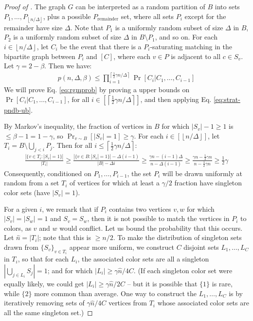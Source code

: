 \documentclass[10pt]{article}
\theoremstyle{definition}\newtheorem{definition}[lemma]{Definition}
\theoremstyle{remark}  \newtheorem*{remark}{Remark}
\newcommand{\hatn}{\hat{n}}
\newcommand{\ceil}[1]{{\left\lceil{#1}\right\rceil}}
\newcommand{\floor}[1]{{\left\lfloor{#1}\right\rfloor}}
\begin{document}
\begin{proof}[Proof of ]
  The graph $G$ can be interpreted as a random partition of $B$ into sets $P_1,\ldots,P_{\floor{n/\Delta}}$, plus a possible $P_{\text{remainder}}$ set, where all sets $P_i$ except for the remainder have size $\Delta$. Note that $P_1$ is a uniformly random subset of size $\Delta$ in $B$, $P_2$ is a uniformly random subset of size $\Delta$ in $B \setminus P_1$, and so on.
  For each $i \in \floor{n/\Delta}$, let $C_i$ be the event that there is a $P_i$-saturating
  matching in the bipartite graph between $P_i$ and $[C]$, where each $v \in P$ is adjacent to all $c \in S_v$. Let $\gamma = 2 - \beta$. Then we have:
  \begin{align}
    p(n, \Delta, \beta) \le \prod_{i = 1}^{\ceil{\frac{1}{2} \gamma n / \Delta}} \Pr[C_i | C_1,\ldots,C_{i-1}] \label{eq:strat-pndb-ub}
  \end{align}
  We will prove Eq. \ref{eq:rgmprob} by proving a upper bounds on $\Pr[C_i | C_1,\ldots,C_{i-1}]$, for all $i \in [\ceil{\frac{1}{2} \gamma n / \Delta}]$, and then applying Eq. \ref{eq:strat-pndb-ub}.
  
  By Markov's inequality, the fraction of vertices in $B$ for which $|S_v| - 1 \ge 1$ is $\le \beta - 1 = 1 - \gamma$, so $\Pr_{v \sim B}[|S_v| = 1] \ge \gamma$. For each $i \in [\floor{n/\Delta}]$, let $T_i = B \setminus \bigcup_{j < i} P_j$. Then for all $i \le \ceil{\frac{1}{2} \gamma n / \Delta}$:
  \begin{align*}
    \frac{|\{v \in T_i : |S_v| = 1\}|}{|T_i|} \ge \frac{|\{v \in B : |S_v| = 1\}| - \Delta (i-1)}{|B| - \Delta i} \ge \frac{\gamma n - (i-1) \Delta}{n - \Delta (i-1)} \ge \frac{\gamma n - \frac{1}{2} \gamma n}{n - \frac{1}{2} \gamma n} \ge \frac{1}{2} \gamma
  \end{align*}
  Consequently, conditioned on $P_1,\ldots,P_{i-1}$, the set $P_i$ will be drawn uniformly at random from a set $T_i$ of vertices for which at least a $\gamma / 2$ fraction have singleton color sets (have $|S_v| = 1$).
  
  For a given $i$, we remark that if $P_i$ contains two vertices $v,w$ for which $|S_v| = |S_w| = 1$ and $S_v = S_w$, then it is not possible to match the vertices in $P_i$ to colors, as $v$ and $w$ would conflict. Let us bound the probability that this occurs. Let $\hatn = |T_i|$; note that this is $\ge n / 2$. To make the distribution of singleton sets drawn from $\{S_v\}_{v \in T_i}$ appear more uniform, we construct $C$ disjoint sets $L_1,\ldots,L_C$ in $T_i$, so that for each $L_i$, the associated color sets are all a singleton $|\bigcup_{j\in L_i} S_j| = 1$; and for which $|L_i| \ge \gamma \hatn / 4 C$. (If each singleton color set were equally likely, we could get $|L_i| \ge \gamma \hatn / 2 C$ -- but it is possible that $\{1\}$ is rare, while $\{2\}$ more common than average. One way to construct the $L_1,\ldots,L_C$ is by iteratively removing sets of $\gamma \hatn / 4 C$ vertices from $T_i$ whose associated color sets are all the same singleton set.)
  

\end{proof}
\end{document}

